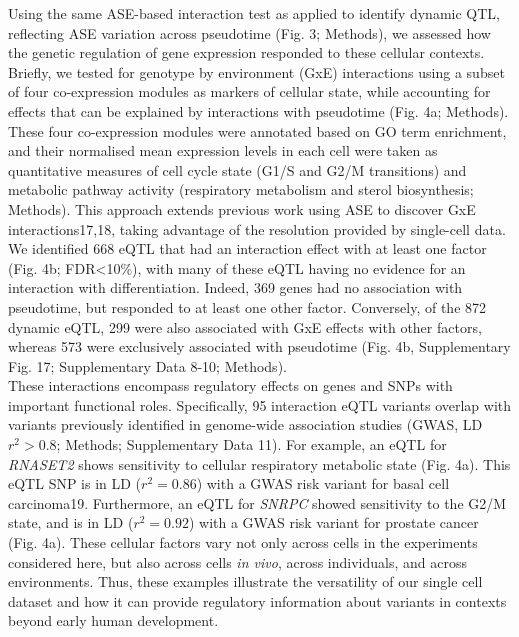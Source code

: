 Using the same ASE-based interaction test as applied to identify dynamic QTL, reflecting ASE variation across pseudotime (Fig. 3; Methods), we assessed how the genetic regulation of gene expression responded to these cellular contexts. 
Briefly, we tested for genotype by environment (GxE) interactions using a subset of four co-expression modules as markers of cellular state, while accounting for effects that can be explained by interactions with pseudotime (Fig. 4a; Methods). 
These four co-expression modules were annotated based on GO term enrichment, and their normalised mean expression levels in each cell were taken as quantitative measures of cell cycle state (G1/S and G2/M transitions) and metabolic pathway activity (respiratory metabolism and sterol biosynthesis; Methods). 
This approach extends previous work using ASE to discover GxE interactions17,18, taking advantage of the resolution provided by single-cell data. 
We identified 668 eQTL that had an interaction effect with at least one factor (Fig. 4b; FDR<10\%), with many of these eQTL having no evidence for an interaction with differentiation.
Indeed, 369 genes had no association with pseudotime, but responded to at least one other factor. 
Conversely, of the 872 dynamic eQTL, 299 were also associated with GxE effects with other factors, whereas 573 were exclusively associated with pseudotime (Fig. 4b, Supplementary Fig. 17; Supplementary Data 8-10; Methods).\\

These interactions encompass regulatory effects on genes and SNPs with important functional roles. Specifically, 95 interaction eQTL variants overlap with variants previously identified in genome-wide association studies (GWAS, LD $r^2>0.8$; Methods; Supplementary Data 11). 
For example, an eQTL for \textit{RNASET2} shows sensitivity to cellular respiratory metabolic state (Fig. 4a). 
This eQTL SNP is in LD ($r^2=0.86$) with a GWAS risk variant for basal cell carcinoma19. Furthermore, an eQTL for \textit{SNRPC} showed sensitivity to the G2/M state, and is in LD ($r^2=0.92$) with a GWAS risk variant for prostate cancer (Fig. 4a). 
These cellular factors vary not only across cells in the experiments considered here, but also across cells \textit{in vivo}, across individuals, and across environments. 
Thus, these examples illustrate the versatility of our single cell dataset and how it can provide regulatory information about variants in contexts beyond early human development.\\

